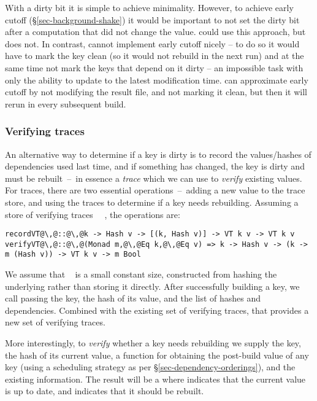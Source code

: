 With a dirty bit it is simple to achieve minimality. However, to achieve early
cutoff (\S\ref{sec-background-shake}) it would be important to not set the dirty
bit after a computation that did not change the value. \Excel could use this
approach, but does not. In contrast, \Make cannot implement early cutoff nicely
-- to do so it would have to mark the key clean (so it would not rebuild in the next
run) and at the same time not mark the keys that depend on it dirty -- an
impossible task with only the ability to update to the latest modification time.
\Make can approximate early cutoff by not modifying the result file, and not
marking it clean, but then it will rerun in every subsequent build.

\vspace{-2mm}
\subsubsection{Verifying traces}\label{sec-verifying-traces}

An alternative way to determine if a key is dirty is to record the
values/hashes of dependencies used last time, and if something has changed, the
key is dirty and must be rebuilt~--~in essence a \emph{trace} which we can use
to \emph{verify} existing values. For traces, there are two essential
operations~--~adding a new value to the trace store, and using the traces to
determine if a key needs rebuilding. Assuming a store of verifying traces
~~, the operations are:

\begin{verbatim}
recordVT@\,@::@\,@k -> Hash v -> [(k, Hash v)] -> VT k v -> VT k v
verifyVT@\,@::@\,@(Monad m,@\,@Eq k,@\,@Eq v) => k -> Hash v -> (k -> m (Hash v)) -> VT k v -> m Bool
\end{verbatim}

\noindent
We assume that ~ is a small constant size, constructed from
hashing the underlying  rather than storing it directly. After
successfully building a key, we call  passing the key, the hash of
its value, and the list of hashes and dependencies. Combined with the existing
set of verifying traces, that provides a new set of verifying traces.

More interestingly, to \emph{verify} whether a key needs rebuilding we supply
the key, the hash of its current value, a function for obtaining the post-build
value of any key (using a scheduling strategy as per
\S\ref{sec-dependency-orderings}), and the existing  information. The
result will be a  where  indicates that the current value is
up to date, and  indicates that it should be rebuilt.

